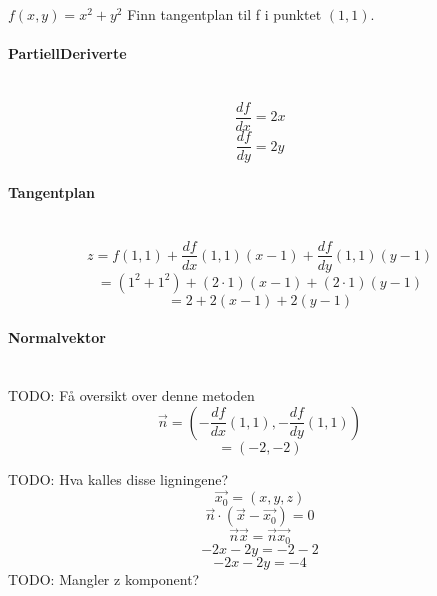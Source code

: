 $f(x,y) = x^2 + y^2$ \quad
Finn tangentplan til f i punktet $(1,1)$.

\paragraph{PartiellDeriverte} \mbox{} \\
$$\frac{df}{dx} = 2x$$
$$\frac{df}{dy} = 2y$$

\paragraph{Tangentplan} \mbox{} \\
$$z = f(1,1) + \frac{df}{dx}(1,1)(x-1) + \frac{df}{dy}(1,1)(y-1)$$
$$= (1^2 + 1^2) + (2\cdot 1)(x-1) + (2\cdot 1)(y-1)$$
$$= 2 + 2(x-1) + 2(y-1)$$

\paragraph{Normalvektor} \mbox{} \\
TODO: Få oversikt over denne metoden
$$\vec{n} = (-\frac{df}{dx}(1,1), -\frac{df}{dy}(1,1))$$
$$= (-2, -2)$$

TODO: Hva kalles disse ligningene?
$$\vec{x_0}=(x,y,z)$$
$$\vec{n} \cdot (\vec{x} - \vec{x_0}) = 0$$
$$\vec{n}\vec{x} = \vec{n}\vec{x_0}$$
$$-2x -2y = -2 -2$$
$$-2x -2y = -4$$
TODO: Mangler z komponent?
